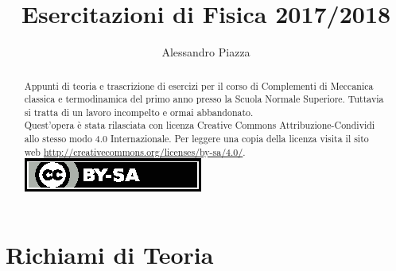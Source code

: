 \documentclass[a4paper, 10pt]{article}
\title{Esercitazioni di Fisica 2017/2018}
\author{Alessandro Piazza}
\theoremstyle{definition}
\begin{document}
\maketitle

\clearpage

\begin{abstract}
    Appunti di teoria e trascrizione di esercizi per il corso di Complementi di Meccanica classica e termodinamica del primo anno presso la Scuola Normale Superiore. Tuttavia si tratta di un lavoro incompelto e ormai abbandonato. \\

    Quest'opera è stata rilasciata con licenza Creative Commons Attribuzione-Condividi allo stesso modo 4.0 Internazionale. Per leggere una copia della licenza visita il sito web \url{http://creativecommons.org/licenses/by-sa/4.0/}.
    \href{http://creativecommons.org/licenses/by-sa/4.0/}{\includegraphics[scale=0.8]{by-sa}}
\end{abstract}

\tableofcontents

\clearpage

\section{Richiami di Teoria}


\clearpage



\end{document}
